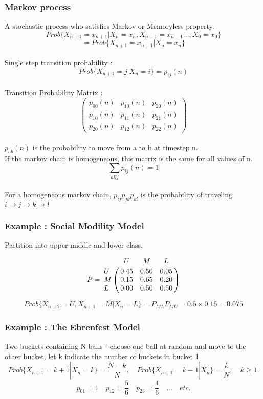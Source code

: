 \documentclass{article}
\begin{document}
	\subsubsection{Markov process}
	A stochastic process who satisfies Markov or Memoryless property. 
	\[Prob\{ X_{n+1} = x_{n+1} | X_n = x_n, X_{n-1} = x_{n-1} \ldots , X_0 = x_0 \}\]
	\[= Prob\{ X_{n+1} = x_{n+1} | X_n = x_n\}\]
	\\Single step transition probability :
	\[Prob\{X_{n+1} = j | X_n = i \} = p_{ij}(n) \]
	\\Transition Probability Matrix : 
	\[ \left( \begin{array}{ccc}
            p_{00}(n) & p_{10}(n) & p_{20}(n) \\
			p_{10}(n) & p_{11}(n) & p_{21}(n) \\
			p_{20}(n) & p_{12}(n) & p_{22}(n) 
	\end{array} \right)\] 
 	\\$p_{ab}(n)$ is the probability to move from a to b at timestep n.
 	\\If the markov chain is homogeneous, this matrix is the same for all values of n. 
	\\$$\sum\limits_{all j}{p_{ij}(n)} = 1$$
	\\For a homogeneous markov chain, $p_{ij} p_{jk} p_{kl}$ is the probability of traveling $i\rightarrow j\rightarrow k\rightarrow l$
	\\\subsubsection{Example : Social Modility Model }
	Partition into upper middle and lower class. 
	
	\[P = \bordermatrix{   
              & U    & M    & L    \cr
            U & 0.45 & 0.50 & 0.05 \cr
			M & 0.15 & 0.65 & 0.20 \cr
			L & 0.00 & 0.50 & 0.50  }
    \]

	$$Prob\{ X_{n+2} = U, X_{n+1} = M | X_n = L \} = P_{ML}P_{MU} = 0.5 \times 0.15 = 0.075 $$
 	\subsubsection{Example : The Ehrenfest Model}
 	Two buckets containing N balls - choose one ball at random and move to the other bucket, let k indicate the number of buckets in bucket 1. 
 	\[ Prob\{ X_{n+1} = k + 1 | X_{n} = k \} = \frac{ N - k}{N}, \quad Prob\{ X_{n+1} = k-1 | X_n \} = \frac{k}{N}, \quad k \geq 1.\] 
 	\[p_{01} = 1 \quad p_{12} = \frac{5}{6} \quad p_{23} = \frac{4}{6} \quad \ldots \quad etc. \]
\end{document}
